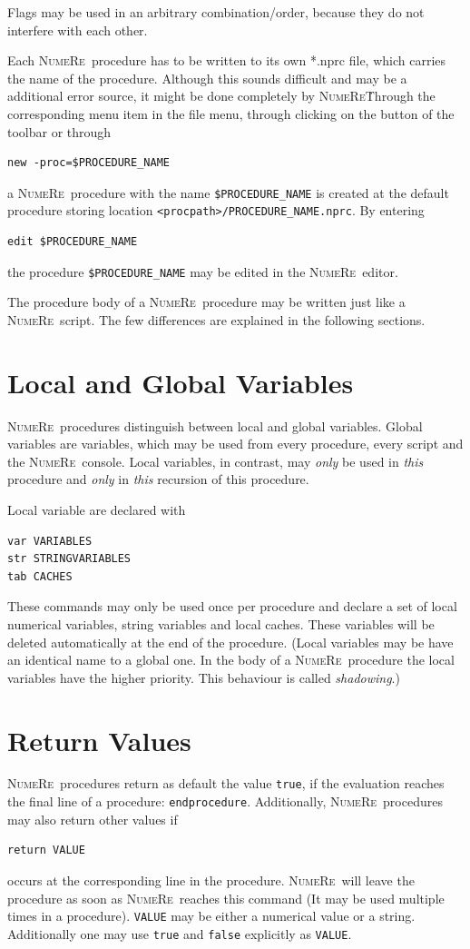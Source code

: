 \documentclass[DIV=14,headsepline,footsepline]{scrbook}
\newcommand{\NR}{\textsc{Nu\-me\-Re}}
\begin{document}
				Flags may be used in an arbitrary combination/order, because they do not interfere with each other.
				
				Each \NR\ procedure has to be written to its own *.nprc file, which carries the name of the procedure. Although this sounds difficult and may be a additional error source, it might be done completely by \NR\. Through the corresponding menu item in the file menu, through clicking on the button of the toolbar or through
				\begin{lstlisting}
new -proc=$PROCEDURE_NAME
				\end{lstlisting}
				a \NR\ procedure with the name \verb+$PROCEDURE_NAME+ is created at the default procedure storing location \verb+<procpath>/PROCEDURE_NAME.nprc+. By entering 
				\begin{lstlisting}
edit $PROCEDURE_NAME
				\end{lstlisting}
				the procedure \verb+$PROCEDURE_NAME+ may be edited in the \NR\ editor.
				
				The procedure body of a \NR\ procedure may be written just like a \NR\ script. The few differences are explained in the following sections.
			\section{Local and Global Variables}
				\NR\ procedures distinguish between local and global variables. Global variables are variables, which may be used from every procedure, every script and the \NR\ console. Local variables, in contrast, may \emph{only} be used in \emph{this} procedure and \emph{only} in \emph{this} recursion of this procedure.
				
				Local variable are declared with
				\begin{lstlisting}
var VARIABLES
str STRINGVARIABLES
tab CACHES
				\end{lstlisting}
				These commands may only be used once per procedure and declare a set of local numerical variables, string variables and local caches. These variables will be deleted automatically at the end of the procedure. (Local variables may be have an identical name to a global one. In the body of a \NR\ procedure the local variables have the higher priority. This behaviour is called \emph{shadowing}.)
			\section{Return Values}
				\NR\ procedures return as default the value \verb+true+, if the evaluation reaches the final line of a procedure: \verb+endprocedure+. Additionally, \NR\ procedures may also return other values if
				\begin{lstlisting}
return VALUE
				\end{lstlisting}
				occurs at the corresponding line in the procedure. \NR\ will leave the procedure as soon as \NR\ reaches this command (It may be used multiple times in a procedure). \verb+VALUE+ may be either a numerical value or a string. Additionally one may use \verb+true+ and \verb+false+ explicitly as \verb+VALUE+.
				
\end{document}
